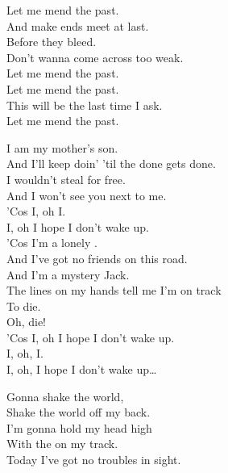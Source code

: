 Let me mend the past. \\
And make ends meet at last. \\
Before they bleed. \\
Don't wanna come across too weak. \\

Let me mend the past. \\
Let me mend the past. \\
This will be the last time I ask. \\
Let me mend the past. \\





I am my mother's son. \\
And I'll keep doin' 'til the done gets done. \\
I wouldn't steal for free. \\
And I won't see you next to me. \\

'Cos I, oh I. \\
I, oh I hope I don't wake up. \\

'Cos I'm a lonely . \\
And I've got no friends on this road. \\
And I'm a mystery Jack. \\
The lines on my hands tell me I'm on track \\

To die. \\
Oh, die! \\
'Cos I, oh I hope I don't wake up. \\

I, oh, I. \\
I, oh, I hope I don't wake up… \\





Gonna shake the world, \\
Shake the world off my back. \\
I'm gonna hold my head high \\
With the  on my track. \\
Today I've got no troubles in sight. \\

